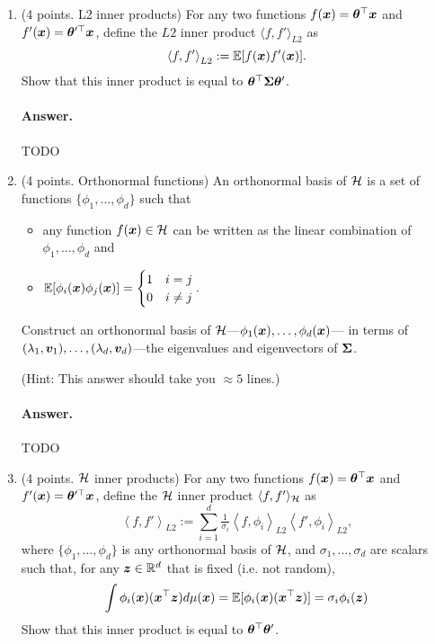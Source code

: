 \documentclass[11pt,letterpaper]{article}
\newenvironment{answer}{%
    \vspace{1em}
    \color{black}
    \paragraph{Answer.}
  }{%
    \vspace{1em}
  }
\begin{document}
\begin{enumerate}

  \item (4 points. L2 inner products)
    For any two functions $f({\bm{x}}) = {\bm{\theta}}^\top {\bm{x}}$ and $f'({\bm{x}}) = {\bm{\theta}}^{\prime\top} {\bm{x}}$,
    define the $L2$ inner product $\langle f, f' \rangle_{L2}$ as
    $$ \left\langle f, f' \right\rangle_{L2} := \mathbb{E}[ f({\bm{x}}) f'({\bm{x}}) ]. $$
    Show that this inner product is equal to ${\bm{\theta}}^\top {\bm{\Sigma}} {\bm{\theta}}'$.

\begin{answer}
  TODO
\end{answer}

  \item (4 points. Orthonormal functions)
    An orthonormal basis of $\mathcal{H}$ is a set of functions $\{ \phi_1, \ldots, \phi_d \}$ such that
    \begin{itemize}
      \item any function $f({\bm{x}}) \in \mathcal{H}$ can be written as the linear combination of $\phi_1, \ldots, \phi_d$ and
      \item $\mathbb{E}[ \phi_i({\bm{x}}) \phi_j({\bm{x}}) ]= \begin{cases} 1 & i=j \\ 0 & i \ne j \end{cases}.$
    \end{itemize}
    Construct an orthonormal basis of $\mathcal{H}$---$\phi_1({\bm{x}}), \ldots, \phi_d({\bm{x}})$---%
    in terms of $(\lambda_1, {\bm{v}}_1), \ldots, (\lambda_d, {\bm{v}}_d)$---the eigenvalues and eigenvectors of ${\bm{\Sigma}}$.

    (Hint: This answer should take you $\approx 5$ lines.)

\begin{answer}
  TODO
\end{answer}

  \item (4 points. $\mathcal{H}$ inner products)
    For any two functions $f({\bm{x}}) = {\bm{\theta}}^\top {\bm{x}}$ and $f'({\bm{x}}) = {\bm{\theta}}^{\prime\top} {\bm{x}}$,
    define the $\mathcal{H}$ inner product $\langle f, f' \rangle_{\mathcal{H}}$ as
    $$ \left\langle f, f' \right\rangle_{L2} := \sum_{i=1}^d
      \tfrac{1}{\sigma_i}
      \left\langle f, \phi_i \right\rangle_{L2}
      \left\langle f', \phi_i \right\rangle_{L2},
    $$
    where $\{ \phi_1, \ldots, \phi_d \}$ is any orthonormal basis of $\mathcal{H}$,
    and $\sigma_1, \ldots, \sigma_d$ are scalars such that, for any ${\bm{z}} \in \mathbb{R}^d$ that is fixed (i.e. not random),
    $$
      \int \phi_i({\bm{x}}) ({\bm{x}}^\top {\bm{z}}) d\mu({\bm{x}}) = \mathbb{E}[ \phi_i({\bm{x}}) ({\bm{x}}^\top {\bm{z}})] = \sigma_i \phi_i({\bm{z}})
    $$
    Show that this inner product is equal to ${\bm{\theta}}^\top {\bm{\theta}}'$.


\end{enumerate}
\end{document}
